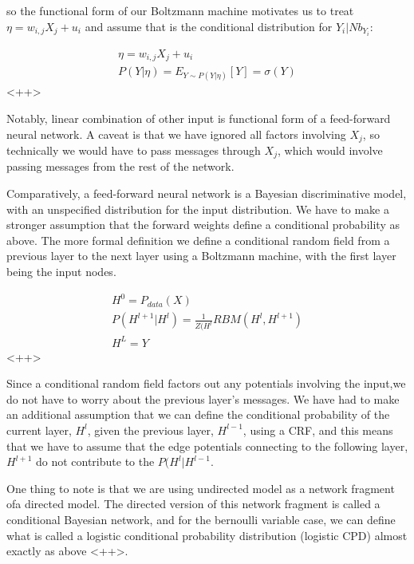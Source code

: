 \documentclass[a4paper]{article}
\begin{document}
so the functional form of our Boltzmann machine motivates us to treat $\eta = w_{i,j} X_j + u_i$ and assume that is the conditional distribution for $Y_i \vert Nb_{Y_i}$:

\begin{equation}
  \begin{split}
    \eta = w_{i,j} X_j + u_i \\
    P(Y \vert \eta) = E_{Y \sim P(Y \vert \eta)} \left[ Y \right] = \sigma (Y)
  \end{split}
  \label{<++>}
\end{equation}<++>

Notably, linear combination of other input is functional form of a feed-forward neural network. 
A caveat is that we have ignored all factors involving $X_j$, so technically we would have to pass messages through $X_j$, which would involve passing messages from the rest of the network. 

Comparatively, a feed-forward neural network is a Bayesian discriminative model, with an unspecified distribution for the input distribution. 
We have to make a stronger assumption that the forward weights define a conditional probability as above. 
The more formal definition we define a conditional random field from a previous layer to the next layer using a Boltzmann machine, with the first layer being the input nodes.

\begin{equation}
  \begin{split}
    H^0 = P_{data}(X) \\
    P( H^{l+1} \vert H^l ) = \frac{1}{Z(H^l} RBM(H^l, H^{l+1}) \\
    H^L = Y
  \end{split}
  \label{<++>}
\end{equation}<++>

Since a conditional random field factors out any potentials involving the input,we do not have to worry about the previous layer's messages. 
We have had to make an additional assumption that we can define the conditional probability of the current layer, $H^l$, given the previous layer, $H^{l-1}$, using a CRF, and this means that we have to assume that the edge potentials connecting to the following layer, $H^{l+1}$ do not contribute to the $P(H^l \vert H^{l-1}$. 

One thing to note is that we are using undirected model as a network fragment ofa directed model. 
The directed version of this network fragment is called a conditional Bayesian network, and for the bernoulli variable case, we can define what is called a logistic conditional probability distribution (logistic CPD) almost exactly as above <++>.
\end{document}
